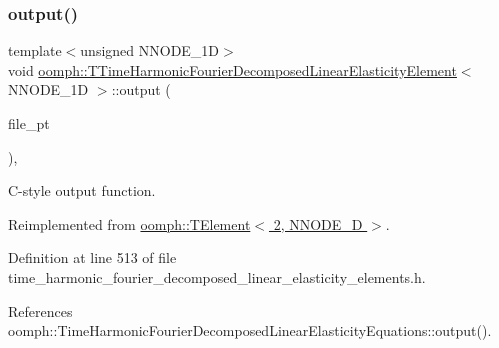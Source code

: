 \subsubsection{\texorpdfstring{output()}{output()}\hspace{0.1cm}{\footnotesize\ttfamily [3/4]}}
{\footnotesize\ttfamily template$<$unsigned N\+N\+O\+D\+E\+\_\+1D$>$ \\
void \hyperlink{classoomph_1_1TTimeHarmonicFourierDecomposedLinearElasticityElement}{oomph\+::\+T\+Time\+Harmonic\+Fourier\+Decomposed\+Linear\+Elasticity\+Element}$<$ N\+N\+O\+D\+E\+\_\+1D $>$\+::output (\begin{DoxyParamCaption}\item[{F\+I\+LE $\ast$}]{file\+\_\+pt }\end{DoxyParamCaption})\hspace{0.3cm}{\ttfamily [inline]}, {\ttfamily [virtual]}}



C-\/style output function. 



Reimplemented from \hyperlink{classoomph_1_1TElement_3_012_00_01NNODE__1D_01_4_acf3bfd1c5a6462aa9555bc8451914e63}{oomph\+::\+T\+Element$<$ 2, N\+N\+O\+D\+E\+\_\+D $>$}.



Definition at line 513 of file time\+\_\+harmonic\+\_\+fourier\+\_\+decomposed\+\_\+linear\+\_\+elasticity\+\_\+elements.\+h.



References oomph\+::\+Time\+Harmonic\+Fourier\+Decomposed\+Linear\+Elasticity\+Equations\+::output().

\mbox{\label{classoomph_1_1TTimeHarmonicFourierDecomposedLinearElasticityElement_a05e2f49a9bd2941f4bbabd5f0279d86a}} 
